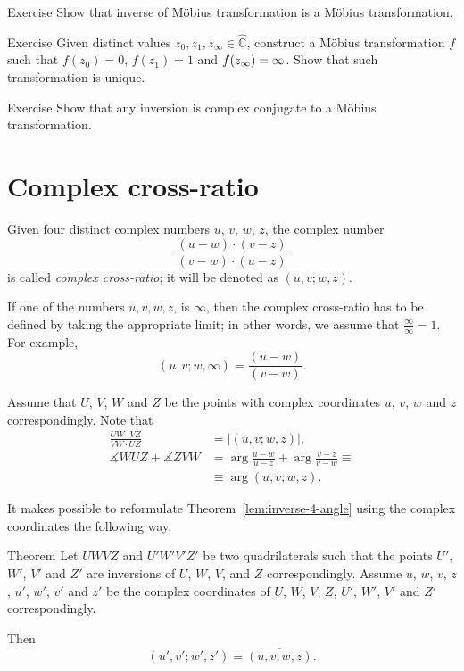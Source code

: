\begin{thm}{Exercise}\label{ex:inverse-Mob}
Show that inverse of M\"obius transformation is a M\"obius transformation.
\end{thm}


\begin{thm}{Exercise}\label{ex:3-point-Mob}
Given distinct values $z_0,z_1,z_\infty\in \hat{\mathbb{C}}$,
construct a M\"obius transformation $f$ such that $f(z_0)=0$, $f(z_1)=1$ and $f(z_\infty)\z=\infty$.
Show that such transformation is unique.
\end{thm}

\begin{thm}{Exercise}\label{ex:invesion-Mob}
Show that any inversion is complex conjugate to a M\"obius transformation.  
\end{thm}



\section*{Complex cross-ratio}

Given four distinct complex numbers $u$, $v$, $w$, $z$,
the complex number
$$
\frac{(u-w)\cdot(v-z)}{(v-w)\cdot(u-z)}$$
is called \emph{complex cross-ratio}; it will be denoted as $(u,v;w,z)$.

If one of the numbers $u, v, w, z$, is $\infty$, 
then the complex cross-ratio has to be defined by taking the appropriate limit; in other words, we assume that $\frac\infty\infty=1$.
For example,
$$(u, v; w, \infty)=\frac{(u-w)}{(v-w)}.$$

Assume that $U$, $V$, $W$ and  $Z$ be the points with complex coordinates  
$u$, $v$, $w$ and $z$ correspondingly.
Note that 
\begin{align*}
\frac{UW\cdot VZ}{VW\cdot UZ}&=|(u,v;w,z)|,
\\
\measuredangle WUZ +\measuredangle ZVW&=\arg\frac{u-w}{u-z}+\arg\frac{v-z}{v-w}\equiv 
\\
&\equiv \arg(u,v;w,z).
\end{align*}

It makes possible to reformulate Theorem~\ref{lem:inverse-4-angle} using the complex coordinates
the following way.

\begin{thm}{Theorem}\label{lem:inverse-4-angle-C}
Let $UWVZ$ and $U'W'V'Z'$  be two quadrilaterals 
such that the points $U'$, $W'$, $V'$ and $Z'$ are inversions of $U$, $W$, $V$, and $Z$ correspondingly.
Assume $u$, $w$, $v$, $z$, $u'$, $w'$, $v'$ and $z'$ be the complex coordinates of $U$, $W$, $V$, $Z$, $U'$, $W'$, $V'$ and $Z'$ correspondingly.

Then 
$$(u',v';w',z')=\overline{(u,v;w,z)}.$$

\end{thm}

